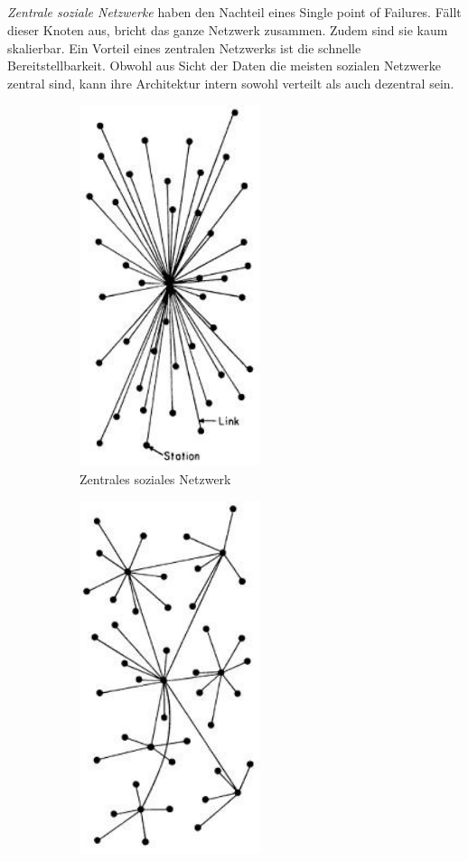 	\subsection{
		\label{sub:difference}
	}
	\textit{Zentrale soziale Netzwerke} haben den Nachteil eines \glqq Single point of Failures\grqq. Fällt dieser Knoten aus, bricht das ganze Netzwerk zusammen. Zudem sind sie kaum skalierbar. Ein Vorteil eines zentralen Netzwerks ist die schnelle Bereitstellbarkeit. Obwohl aus Sicht der Daten die meisten sozialen Netzwerke zentral sind, kann ihre Architektur intern sowohl verteilt als auch dezentral sein.
	\begin{figure}[H] 
		\centering
		\begin{subfigure}[t]{0.4\linewidth}
			\centering
			\includegraphics[width=0.4\linewidth]{figures/centralized-network.png}
			\caption{Zentrales soziales Netzwerk}
			\label{fig:central-network}
		\end{subfigure}
		\begin{subfigure}[t]{0.4\linewidth}
			\centering
			\includegraphics[width=0.4\linewidth]{figures/decentralized-network.png}

\end{subfigure}
\end{figure}

